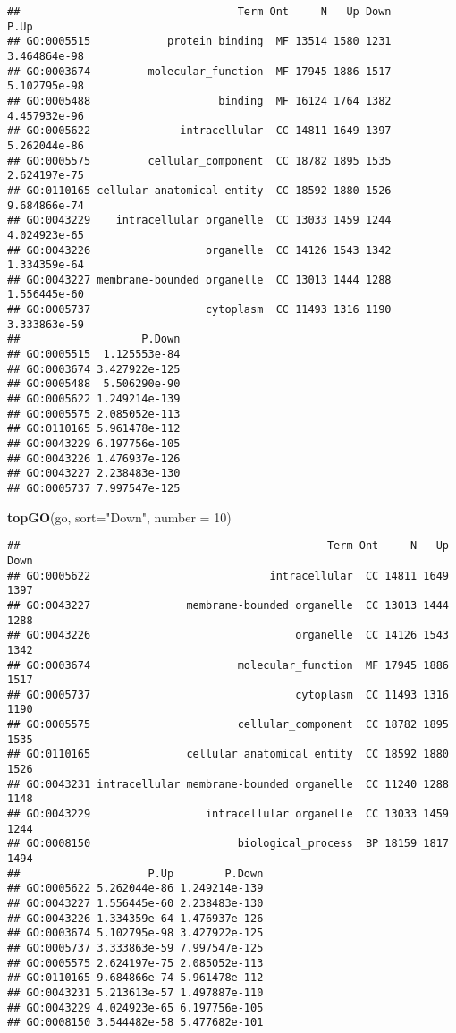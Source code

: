 \documentclass[
]{article}
\newenvironment{Shaded}{\begin{snugshade}}{\end{snugshade}}
\newcommand{\DataTypeTok}[1]{\textcolor[rgb]{0.13,0.29,0.53}{#1}}
\newcommand{\DecValTok}[1]{\textcolor[rgb]{0.00,0.00,0.81}{#1}}
\newcommand{\KeywordTok}[1]{\textcolor[rgb]{0.13,0.29,0.53}{\textbf{#1}}}
\newcommand{\NormalTok}[1]{#1}
\newcommand{\StringTok}[1]{\textcolor[rgb]{0.31,0.60,0.02}{#1}}
\begin{document}
\begin{verbatim}
##                                  Term Ont     N   Up Down         P.Up
## GO:0005515            protein binding  MF 13514 1580 1231 3.464864e-98
## GO:0003674         molecular_function  MF 17945 1886 1517 5.102795e-98
## GO:0005488                    binding  MF 16124 1764 1382 4.457932e-96
## GO:0005622              intracellular  CC 14811 1649 1397 5.262044e-86
## GO:0005575         cellular_component  CC 18782 1895 1535 2.624197e-75
## GO:0110165 cellular anatomical entity  CC 18592 1880 1526 9.684866e-74
## GO:0043229    intracellular organelle  CC 13033 1459 1244 4.024923e-65
## GO:0043226                  organelle  CC 14126 1543 1342 1.334359e-64
## GO:0043227 membrane-bounded organelle  CC 13013 1444 1288 1.556445e-60
## GO:0005737                  cytoplasm  CC 11493 1316 1190 3.333863e-59
##                   P.Down
## GO:0005515  1.125553e-84
## GO:0003674 3.427922e-125
## GO:0005488  5.506290e-90
## GO:0005622 1.249214e-139
## GO:0005575 2.085052e-113
## GO:0110165 5.961478e-112
## GO:0043229 6.197756e-105
## GO:0043226 1.476937e-126
## GO:0043227 2.238483e-130
## GO:0005737 7.997547e-125
\end{verbatim}

\begin{Shaded}
\begin{Highlighting}[]
\KeywordTok{topGO}\NormalTok{(go,  }\DataTypeTok{sort=}\StringTok{"Down"}\NormalTok{, }\DataTypeTok{number =} \DecValTok{10}\NormalTok{)}
\end{Highlighting}
\end{Shaded}

\begin{verbatim}
##                                                Term Ont     N   Up Down
## GO:0005622                            intracellular  CC 14811 1649 1397
## GO:0043227               membrane-bounded organelle  CC 13013 1444 1288
## GO:0043226                                organelle  CC 14126 1543 1342
## GO:0003674                       molecular_function  MF 17945 1886 1517
## GO:0005737                                cytoplasm  CC 11493 1316 1190
## GO:0005575                       cellular_component  CC 18782 1895 1535
## GO:0110165               cellular anatomical entity  CC 18592 1880 1526
## GO:0043231 intracellular membrane-bounded organelle  CC 11240 1288 1148
## GO:0043229                  intracellular organelle  CC 13033 1459 1244
## GO:0008150                       biological_process  BP 18159 1817 1494
##                    P.Up        P.Down
## GO:0005622 5.262044e-86 1.249214e-139
## GO:0043227 1.556445e-60 2.238483e-130
## GO:0043226 1.334359e-64 1.476937e-126
## GO:0003674 5.102795e-98 3.427922e-125
## GO:0005737 3.333863e-59 7.997547e-125
## GO:0005575 2.624197e-75 2.085052e-113
## GO:0110165 9.684866e-74 5.961478e-112
## GO:0043231 5.213613e-57 1.497887e-110
## GO:0043229 4.024923e-65 6.197756e-105
## GO:0008150 3.544482e-58 5.477682e-101
\end{verbatim}
\end{document}
